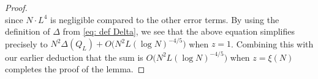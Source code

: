 \documentclass[10pt,a4paper]{amsart}
\begin{document}
\begin{proof}
\begin{equation}
		\end{equation}
		since $N\cdot L^4$ is negligible compared to the other error terms. By using the definition of $\Delta$ from \eqref{eq: def Delta}, we see that the above equation simplifies precisely to $N^2 \Delta(Q_L) +O\big(N^2 L(\log N)^{-4/5}\big)$ when $z = 1$. Combining this with our earlier deduction that the sum is $O\big(N^2 L(\log N)^{-4/5}\big)$ when $z = \xi(N)$ completes the proof of the lemma.
	\end{proof}
\end{document}
